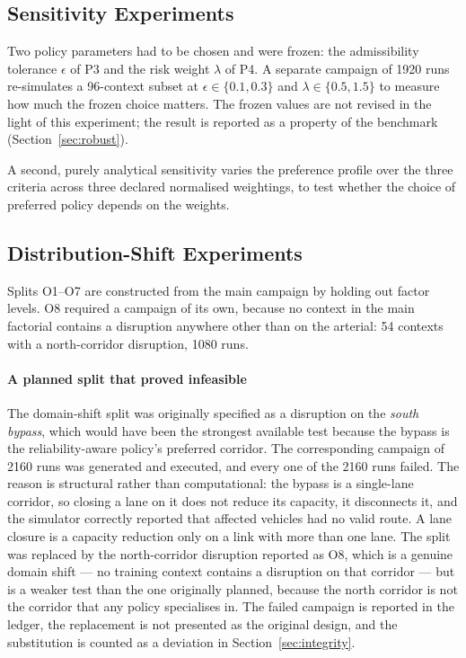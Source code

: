 \subsection{Sensitivity Experiments}
\label{sec:design:sens}

Two policy parameters had to be chosen and were frozen: the admissibility
tolerance $\epsilon$ of P3 and the risk weight $\lambda$ of P4. A separate
campaign of 1920 runs re-simulates a 96-context subset at
$\epsilon \in \{0.1, 0.3\}$ and $\lambda \in \{0.5, 1.5\}$ to measure how much
the frozen choice matters. The frozen values are not revised in the light of this
experiment; the result is reported as a property of the benchmark
(Section~\ref{sec:robust}).

A second, purely analytical sensitivity varies the preference profile over the
three criteria across three declared normalised weightings, to test whether the
choice of preferred policy depends on the weights.

\subsection{Distribution-Shift Experiments}
\label{sec:design:shift}

Splits O1--O7 are constructed from the main campaign by holding out factor
levels. O8 required a campaign of its own, because no context in the main
factorial contains a disruption anywhere other than on the arterial: 54 contexts
with a north-corridor disruption, 1080 runs.

\paragraph{A planned split that proved infeasible}
The domain-shift split was originally specified as a disruption on the
\emph{south bypass}, which would have been the strongest available test because
the bypass is the reliability-aware policy's preferred corridor. The
corresponding campaign of 2160 runs was generated and executed, and every one of
the 2160 runs failed. The reason is structural rather than computational: the
bypass is a single-lane corridor, so closing a lane on it does not reduce its
capacity, it disconnects it, and the simulator correctly reported that affected
vehicles had no valid route. A lane closure is a capacity reduction only on a
link with more than one lane. The split was replaced by the north-corridor
disruption reported as O8, which is a genuine domain shift --- no training
context contains a disruption on that corridor --- but is a weaker test than the
one originally planned, because the north corridor is not the corridor that any
policy specialises in. The failed campaign is reported in the ledger, the
replacement is not presented as the original design, and the substitution is
counted as a deviation in Section~\ref{sec:integrity}.

